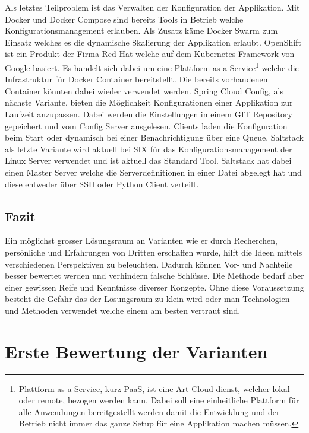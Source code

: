 Als letztes Teilproblem ist das Verwalten der Konfiguration der Applikation. Mit Docker und Docker Compose sind bereits Tools in Betrieb welche Konfigurationsmanagement erlauben. Als Zusatz käme Docker Swarm zum Einsatz welches es die dynamische Skalierung der Applikation erlaubt.\newline
OpenShift ist ein Produkt der Firma Red Hat welche auf dem Kubernetes Framework von Google basiert. Es handelt sich dabei um eine Plattform as a Service\footnote{Plattform as a Service, kurz PaaS, ist eine Art Cloud dienst, welcher lokal oder remote, bezogen werden kann. Dabei soll eine einheitliche Plattform für alle Anwendungen bereitgestellt werden damit die Entwicklung und der Betrieb nicht immer das ganze Setup für eine Applikation machen müssen.} welche die Infrastruktur für Docker Container bereitstellt. Die bereits vorhandenen Container könnten dabei wieder verwendet werden.\newline
Spring Cloud Config, als nächste Variante, bieten die Möglichkeit Konfigurationen einer Applikation zur Laufzeit anzupassen. Dabei werden die Einstellungen in einem GIT Repository gepeichert und vom Config Server ausgelesen. Clients laden die Konfiguration beim Start oder dynamisch bei einer Benachrichtigung über eine Queue.
Saltstack als letzte Variante wird aktuell bei SIX für das Konfigurationsmanagement der Linux Server verwendet und ist aktuell das Standard Tool. Saltstack hat dabei einen Master Server welche die Serverdefinitionen in einer Datei abgelegt hat und diese entweder über SSH oder Python Client verteilt.

\subsection{Fazit}

Ein möglichst grosser Lösungsraum an Varianten wie er durch Recherchen, persönliche und Erfahrungen von Dritten erschaffen wurde, hilft die Ideen mittels verschiedenen Perspektiven zu beleuchten. Dadurch können Vor- und Nachteile besser bewertet werden und verhindern falsche Schlüsse. Die Methode bedarf aber einer gewissen Reife und Kenntnisse diverser Konzepte. Ohne diese Voraussetzung besteht die Gefahr das der Lösungsraum zu klein wird oder man Technologien und Methoden verwendet welche einem am besten vertraut sind.

\section{Erste Bewertung der Varianten}

